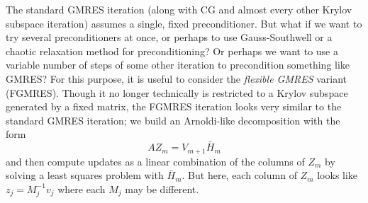 The standard GMRES iteration (along with CG and almost every other
Krylov subspace iteration) assumes a single, fixed preconditioner.
But what if we want to try several preconditioners at once, or
perhaps to use Gauss-Southwell or a chaotic relaxation method for
preconditioning?  Or perhaps we want to use a variable number of
steps of some other iteration to precondition something like GMRES?
For this purpose, it is useful to consider the
{\em flexible GMRES} variant (FGMRES).  Though it no longer technically
is restricted to a Krylov subspace generated by a fixed matrix, the
FGMRES iteration looks very similar to the standard GMRES iteration;
we build an Arnoldi-like decomposition with the form
\[
  AZ_m = V_{m+1} \bar{H}_m
\]
and then compute updates as a linear combination of the columns of $Z_m$
by solving a least squares problem with $\bar{H}_m$.  But here, each
column of $Z_m$ looks like $z_j = M_j^{-1} v_j$ where each $M_j$ may
be different.

